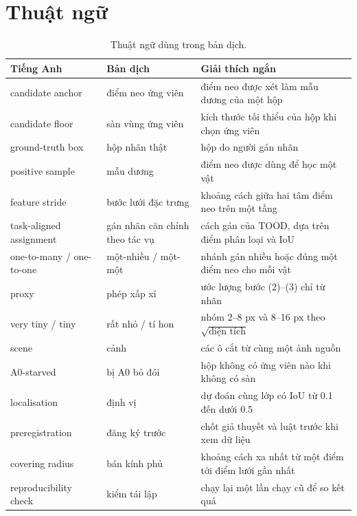 \documentclass[11pt]{article}
\begin{document}
\section{Thuật ngữ}\label{app:glossary}
\begin{table}[h]\centering\caption{Thuật ngữ dùng trong bản dịch.}\label{tab:glossary}\footnotesize
\begin{tabular}{p{}p{}p{}}\toprule
Tiếng Anh & Bản dịch & Giải thích ngắn \\\midrule
candidate anchor & điểm neo ứng viên & điểm neo được xét làm mẫu dương của một hộp \\
candidate floor & sàn vùng ứng viên & kích thước tối thiểu của hộp khi chọn ứng viên \\
ground-truth box & hộp nhãn thật & hộp do người gán nhãn \\
positive sample & mẫu dương & điểm neo được dùng để học một vật \\
feature stride & bước lưới đặc trưng & khoảng cách giữa hai tâm điểm neo trên một tầng \\
task-aligned assignment & gán nhãn căn chỉnh theo tác vụ & cách gán của TOOD, dựa trên điểm phân loại và IoU \\
one-to-many / one-to-one & một-nhiều / một-một & nhánh gán nhiều hoặc đúng một điểm neo cho mỗi vật \\
proxy & phép xấp xỉ & ước lượng bước (2)--(3) chỉ từ nhãn \\
very tiny / tiny & rất nhỏ / tí hon & nhóm 2--8 px và 8--16 px theo $\sqrt{\text{diện tích}}$ \\
scene & cảnh & các ô cắt từ cùng một ảnh nguồn \\
A0-starved & bị A0 bỏ đói & hộp không có ứng viên nào khi không có sàn \\
localisation & định vị & dự đoán cùng lớp có IoU từ 0.1 đến dưới 0.5 \\
preregistration & đăng ký trước & chốt giả thuyết và luật trước khi xem dữ liệu \\
covering radius & bán kính phủ & khoảng cách xa nhất từ một điểm tới điểm lưới gần nhất \\
reproducibility check & kiểm tái lập & chạy lại một lần chạy cũ để so kết quả \\\bottomrule
\end{tabular}\end{table}



\end{document}
